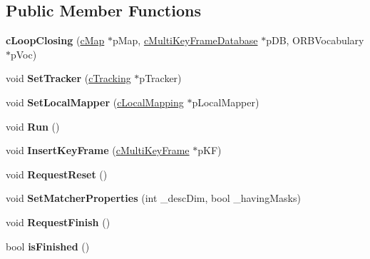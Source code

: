 \subsection*{Public Member Functions}
\begin{DoxyCompactItemize}
\item 
{\bfseries c\+Loop\+Closing} (\hyperlink{classMultiColSLAM_1_1cMap}{c\+Map} $\ast$p\+Map, \hyperlink{classMultiColSLAM_1_1cMultiKeyFrameDatabase}{c\+Multi\+Key\+Frame\+Database} $\ast$p\+DB, O\+R\+B\+Vocabulary $\ast$p\+Voc)\hypertarget{classMultiColSLAM_1_1cLoopClosing_accd03768ad4ab64aa3b81ffebaf1b6bf}{}\label{classMultiColSLAM_1_1cLoopClosing_accd03768ad4ab64aa3b81ffebaf1b6bf}

\item 
void {\bfseries Set\+Tracker} (\hyperlink{classMultiColSLAM_1_1cTracking}{c\+Tracking} $\ast$p\+Tracker)\hypertarget{classMultiColSLAM_1_1cLoopClosing_a11d4d6c476daf56399f4df4eef4dfb07}{}\label{classMultiColSLAM_1_1cLoopClosing_a11d4d6c476daf56399f4df4eef4dfb07}

\item 
void {\bfseries Set\+Local\+Mapper} (\hyperlink{classMultiColSLAM_1_1cLocalMapping}{c\+Local\+Mapping} $\ast$p\+Local\+Mapper)\hypertarget{classMultiColSLAM_1_1cLoopClosing_ad1f76334f64d563487d7d399aaa5124c}{}\label{classMultiColSLAM_1_1cLoopClosing_ad1f76334f64d563487d7d399aaa5124c}

\item 
void {\bfseries Run} ()\hypertarget{classMultiColSLAM_1_1cLoopClosing_ac103f8196d97e398f5e6ac6d8ab3408b}{}\label{classMultiColSLAM_1_1cLoopClosing_ac103f8196d97e398f5e6ac6d8ab3408b}

\item 
void {\bfseries Insert\+Key\+Frame} (\hyperlink{classMultiColSLAM_1_1cMultiKeyFrame}{c\+Multi\+Key\+Frame} $\ast$p\+KF)\hypertarget{classMultiColSLAM_1_1cLoopClosing_a6a5b7fa0901432c9d5c1d0b3a55e4f54}{}\label{classMultiColSLAM_1_1cLoopClosing_a6a5b7fa0901432c9d5c1d0b3a55e4f54}

\item 
void {\bfseries Request\+Reset} ()\hypertarget{classMultiColSLAM_1_1cLoopClosing_a751fbb2d6b528c0207549b0dab66a7ba}{}\label{classMultiColSLAM_1_1cLoopClosing_a751fbb2d6b528c0207549b0dab66a7ba}

\item 
void {\bfseries Set\+Matcher\+Properties} (int \+\_\+desc\+Dim, bool \+\_\+having\+Masks)\hypertarget{classMultiColSLAM_1_1cLoopClosing_ae0093c52ea52cb0f6b05f87df8421a16}{}\label{classMultiColSLAM_1_1cLoopClosing_ae0093c52ea52cb0f6b05f87df8421a16}

\item 
void {\bfseries Request\+Finish} ()\hypertarget{classMultiColSLAM_1_1cLoopClosing_a2023f618fddb9ac0cd2ead612b055300}{}\label{classMultiColSLAM_1_1cLoopClosing_a2023f618fddb9ac0cd2ead612b055300}

\item 
bool {\bfseries is\+Finished} ()\hypertarget{classMultiColSLAM_1_1cLoopClosing_a91ad8352d315ba5ca557044f6adfbfc9}{}\label{classMultiColSLAM_1_1cLoopClosing_a91ad8352d315ba5ca557044f6adfbfc9}

\end{DoxyCompactItemize}
